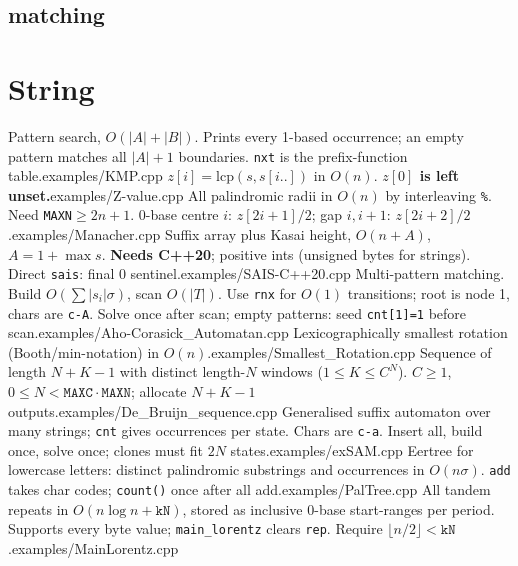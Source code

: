 \subsection{matching}



\section{String}
%
{Pattern search, $O(|A|+|B|)$. Prints every 1-based occurrence; an empty pattern matches all $|A|+1$ boundaries. \texttt{nxt} is the prefix-function table.}{examples/KMP.cpp}
%
{$z[i]=\mathrm{lcp}(s,s[i..])$ in $O(n)$. \textbf{$z[0]$ is left unset.}}{examples/Z-value.cpp}
%
{All palindromic radii in $O(n)$ by interleaving \texttt{\%}. Need \texttt{MAXN}$\ge2n+1$. 0-base centre $i$: $z[2i+1]/2$; gap $i,i+1$: $z[2i+2]/2$.}{examples/Manacher.cpp}
%
{Suffix array plus Kasai height, $O(n+A)$, $A=1+\max s$. \textbf{Needs C++20}; positive ints (unsigned bytes for strings). Direct \texttt{sais}: final 0 sentinel.}{examples/SAIS-C++20.cpp}
%
{Multi-pattern matching. Build $O(\sum|s_i|\sigma)$, scan $O(|T|)$. Use \texttt{rnx} for $O(1)$ transitions; root is node 1, chars are \texttt{c-\textquotesingle A\textquotesingle}. Solve once after scan; empty patterns: seed \texttt{cnt[1]=1} before scan.}{examples/Aho-Corasick_Automatan.cpp}
%
{Lexicographically smallest rotation (Booth/min-notation) in $O(n)$.}{examples/Smallest_Rotation.cpp}
%
{Sequence of length $N+K-1$ with distinct length-$N$ windows ($1\le K\le C^N$). $C\ge1$, $0\le N<\texttt{MAXC}\cdot\texttt{MAXN}$; allocate $N+K-1$ outputs.}{examples/De_Bruijn_sequence.cpp}
%
{Generalised suffix automaton over many strings; \texttt{cnt} gives occurrences per state. Chars are \texttt{c-\textquotesingle a\textquotesingle}. Insert all, build once, solve once; clones must fit $2N$ states.}{examples/exSAM.cpp}
%
{Eertree for lowercase letters: distinct palindromic substrings and occurrences in $O(n\sigma)$. \texttt{add} takes char codes; \texttt{count()} once after all add.}{examples/PalTree.cpp}
%
{All tandem repeats in $O(n\log n+\texttt{kN})$, stored as inclusive 0-base start-ranges per period. Supports every byte value; \texttt{main\_lorentz} clears \texttt{rep}. Require $\lfloor n/2\rfloor<\texttt{kN}$.}{examples/MainLorentz.cpp}


